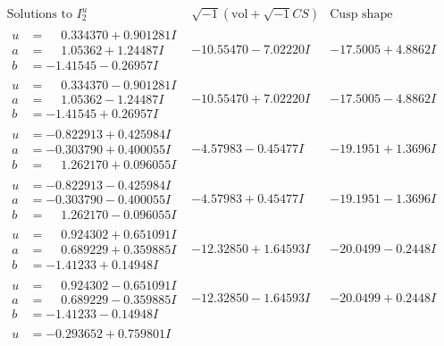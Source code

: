 \documentclass[1p]{elsarticle_modified}
\theoremstyle{definition}
\newcommand{\I}{\sqrt{-1}}
\begin{document}
$$\begin{array}{c|c|c}  
\text{Solutions to }I^u_{2}& \I (\text{vol} + \sqrt{-1}CS) & \text{Cusp shape}\\
 \hline 
\begin{aligned}
u &= \phantom{-}0.334370 + 0.901281 I \\
a &= \phantom{-}1.05362 + 1.24487 I \\
b &= -1.41545 - 0.26957 I\end{aligned}
 & -10.55470 - 7.02220 I & -17.5005 + 4.8862 I \\ \hline\begin{aligned}
u &= \phantom{-}0.334370 - 0.901281 I \\
a &= \phantom{-}1.05362 - 1.24487 I \\
b &= -1.41545 + 0.26957 I\end{aligned}
 & -10.55470 + 7.02220 I & -17.5005 - 4.8862 I \\ \hline\begin{aligned}
u &= -0.822913 + 0.425984 I \\
a &= -0.303790 + 0.400055 I \\
b &= \phantom{-}1.262170 + 0.096055 I\end{aligned}
 & -4.57983 - 0.45477 I & -19.1951 + 1.3696 I \\ \hline\begin{aligned}
u &= -0.822913 - 0.425984 I \\
a &= -0.303790 - 0.400055 I \\
b &= \phantom{-}1.262170 - 0.096055 I\end{aligned}
 & -4.57983 + 0.45477 I & -19.1951 - 1.3696 I \\ \hline\begin{aligned}
u &= \phantom{-}0.924302 + 0.651091 I \\
a &= \phantom{-}0.689229 + 0.359885 I \\
b &= -1.41233 + 0.14948 I\end{aligned}
 & -12.32850 + 1.64593 I & -20.0499 - 0.2448 I \\ \hline\begin{aligned}
u &= \phantom{-}0.924302 - 0.651091 I \\
a &= \phantom{-}0.689229 - 0.359885 I \\
b &= -1.41233 - 0.14948 I\end{aligned}
 & -12.32850 - 1.64593 I & -20.0499 + 0.2448 I \\ \hline\begin{aligned}
u &= -0.293652 + 0.759801 I \\

\end{aligned}
\end{array}$$
\end{document}
